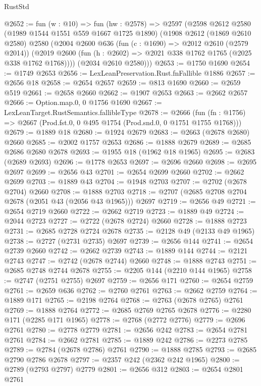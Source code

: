 \begin{lexlean}{RustStd}
\begin{coremodule}
@2652 := fun (w : @10) =>
  fun (hw : @2578) =>
  @2597
    (@2598
      @2612
      @2580
      (@1989 @1544 @1551 @559 @1667 @1725 @1890)
      (@1908
        @2612
        (@1869 @2610 @2580)
        @2580
        (@2004
          @2600
          @636
          (fun (c : @1690) => @2012 @2610 (@2579 @2014))
          (@2019 @2600 (fun (h : @2602) => @2021 @338 @1762 @1765 (@2025 @338 @1762 @1768))))
        (@2034 @2610 @2580)))
@2653 := @1750 @1690
@2654 := @1749 @2653
@2656 := LexLeanPreservation.Rust.fnFallible @1886
@2657 := @2656 @18
@2658 := @2654 @2657
@2659 := @813 @1690
@2660 := @2659 @519
@2661 := @2658 @2660
@2662 := @1907 @2653
@2663 := @2662 @2657
@2666 := Option.map.{0, 0} @1756 @1690
@2667 := LexLeanTarget.RustSemantics.fallibleType
@2678 := @2666
    (fun (fn : @1756) => @2667 (Prod.fst.{0, 0} @495 @1754 (Prod.snd.{0, 0} @1751 @1755 @1768)))
@2679 := @1889 @18
@2680 := @1924 @2679
@2683 := @2663 (@2678 @2680) @2660
@2685 := @2002 @1757 @2653
@2686 := @1888 @2679
@2689 := @2685 @2686 @2680 @2678
@2693 := @1955 @18 (@1962 @18 @1965)
@2695 := @2683 (@2689 @2693)
@2696 := @1778 @2653
@2697 := @2696 @2660
@2698 := @2695 @2697
@2699 := @2656 @43
@2701 := @2654 @2699 @2660
@2702 := @2662 @2699
@2703 := @1889 @43
@2704 := @1948 @2703
@2707 := @2702 (@2678 @2704) @2660
@2708 := @1888 @2703
@2718 := @2707 (@2685 @2708 @2704 @2678 (@2051 @43 (@2056 @43 @1965))) @2697
@2719 := @2656 @49
@2721 := @2654 @2719 @2660
@2722 := @2662 @2719
@2723 := @1889 @49
@2724 := @2044 @2723
@2727 := @2722 (@2678 @2724) @2660
@2728 := @1888 @2723
@2731 := @2685 @2728 @2724 @2678
@2735 := @2128 @49 (@2133 @49 @1965)
@2738 := @2727 (@2731 @2735) @2697
@2739 := @2656 @144
@2741 := @2654 @2739 @2660
@2742 := @2662 @2739
@2743 := @1889 @144
@2744 := @2121 @2743
@2747 := @2742 (@2678 @2744) @2660
@2748 := @1888 @2743
@2751 := @2685 @2748 @2744 @2678
@2755 := @2205 @144 (@2210 @144 @1965)
@2758 := @2747 (@2751 @2755) @2697
@2759 := @2656 @171
@2760 := @2654 @2759
@2761 := @2659 @636
@2762 := @2760 @2761
@2763 := @2662 @2759
@2764 := @1889 @171
@2765 := @2198 @2764
@2768 := @2763 (@2678 @2765) @2761
@2769 := @1888 @2764
@2772 := @2685 @2769 @2765 @2678
@2776 := @2280 @171 (@2285 @171 @1965)
@2778 := @2768 (@2772 @2776)
@2779 := @2696 @2761
@2780 := @2778 @2779
@2781 := @2656 @242
@2783 := @2654 @2781 @2761
@2784 := @2662 @2781
@2785 := @1889 @242
@2786 := @2273 @2785
@2789 := @2784 (@2678 @2786) @2761
@2790 := @1888 @2785
@2793 := @2685 @2790 @2786 @2678
@2797 := @2357 @242 (@2362 @242 @1965)
@2800 := @2789 (@2793 @2797) @2779
@2801 := @2656 @312
@2803 := @2654 @2801 @2761

\end{coremodule}
\end{lexlean}
